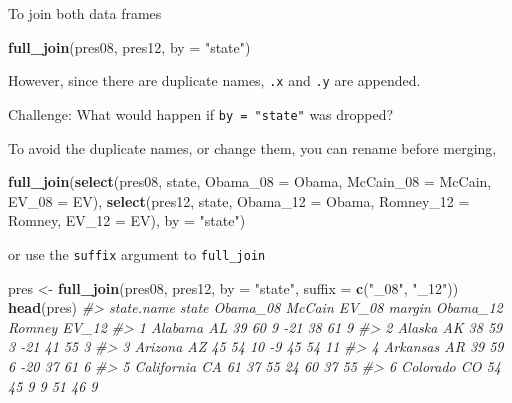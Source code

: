 \documentclass[]{book}
\newenvironment{Shaded}{\begin{snugshade}}{\end{snugshade}}
\newcommand{\KeywordTok}[1]{\textcolor[rgb]{0.13,0.29,0.53}{\textbf{#1}}}
\newcommand{\DataTypeTok}[1]{\textcolor[rgb]{0.13,0.29,0.53}{#1}}
\newcommand{\StringTok}[1]{\textcolor[rgb]{0.31,0.60,0.02}{#1}}
\newcommand{\CommentTok}[1]{\textcolor[rgb]{0.56,0.35,0.01}{\textit{#1}}}
\newcommand{\NormalTok}[1]{#1}
\theoremstyle{definition}
\theoremstyle{definition}
\theoremstyle{definition}
\theoremstyle{remark}
\begin{document}
To join both data frames

\begin{Shaded}
\begin{Highlighting}[]
\KeywordTok{full_join}\NormalTok{(pres08, pres12, }\DataTypeTok{by =} \StringTok{"state"}\NormalTok{)}
\end{Highlighting}
\end{Shaded}

However, since there are duplicate names, \texttt{.x} and \texttt{.y}
are appended.

Challenge: What would happen if \texttt{by\ =\ "state"} was dropped?

To avoid the duplicate names, or change them, you can rename before
merging,

\begin{Shaded}
\begin{Highlighting}[]
\KeywordTok{full_join}\NormalTok{(}\KeywordTok{select}\NormalTok{(pres08, state, }\DataTypeTok{Obama_08 =}\NormalTok{ Obama, }\DataTypeTok{McCain_08 =}\NormalTok{ McCain,}
                 \DataTypeTok{EV_08 =}\NormalTok{ EV),}
          \KeywordTok{select}\NormalTok{(pres12, state, }\DataTypeTok{Obama_12 =}\NormalTok{ Obama, }\DataTypeTok{Romney_12 =}\NormalTok{ Romney,}
                 \DataTypeTok{EV_12 =}\NormalTok{ EV),}
          \DataTypeTok{by =} \StringTok{"state"}\NormalTok{)}
\end{Highlighting}
\end{Shaded}

or use the \texttt{suffix} argument to \texttt{full\_join}

\begin{Shaded}
\begin{Highlighting}[]
\NormalTok{pres <-}\StringTok{ }\KeywordTok{full_join}\NormalTok{(pres08, pres12, }\DataTypeTok{by =} \StringTok{"state"}\NormalTok{, }\DataTypeTok{suffix =} \KeywordTok{c}\NormalTok{(}\StringTok{"_08"}\NormalTok{, }\StringTok{"_12"}\NormalTok{))}
\KeywordTok{head}\NormalTok{(pres)}
\CommentTok{#>   state.name state Obama_08 McCain EV_08 margin Obama_12 Romney EV_12}
\CommentTok{#> 1    Alabama    AL       39     60     9    -21       38     61     9}
\CommentTok{#> 2     Alaska    AK       38     59     3    -21       41     55     3}
\CommentTok{#> 3    Arizona    AZ       45     54    10     -9       45     54    11}
\CommentTok{#> 4   Arkansas    AR       39     59     6    -20       37     61     6}
\CommentTok{#> 5 California    CA       61     37    55     24       60     37    55}
\CommentTok{#> 6   Colorado    CO       54     45     9      9       51     46     9}
\end{Highlighting}
\end{Shaded}
\end{document}
